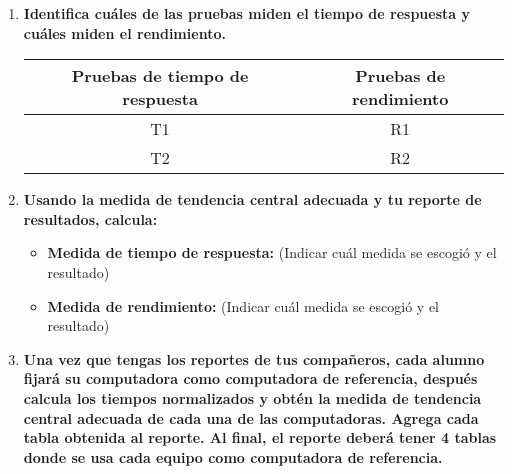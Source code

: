 \documentclass[12pt]{article}
\newcommand{\pl}[1]{\item \textbf{ #1 }}
\begin{document}
\begin{enumerate}[label=(\arabic{section}.\arabic{subsection}.\arabic{enumi})]
    \pl{Identifica cuáles de las pruebas miden el tiempo de respuesta y cuáles miden el rendimiento.}
    \begin{table}[htb]
        \centering
        \begin{tabular}{|c|c|}
        \hline
        Pruebas de tiempo de respuesta & Pruebas de rendimiento \\
        \hline
        T1 & R1 \\
        \hline
        T2 & R2 \\
        \hline
        \end{tabular}
    \end{table}\par

    \pl{Usando la medida de tendencia central adecuada y tu reporte de resultados, calcula:}
    \begin{itemize}
        \pl{Medida de tiempo de respuesta:}(Indicar cuál medida se escogió y el resultado)\par
    
        \pl{Medida de rendimiento:} (Indicar cuál medida se escogió y el resultado)\par
    \end{itemize}

    \pl{Una vez que tengas los reportes de tus compañeros, cada alumno fijará su computadora como computadora de referencia, después calcula los tiempos normalizados y obtén la medida de tendencia central adecuada de cada una de las computadoras. Agrega cada tabla obtenida al reporte. Al final, el reporte deberá tener 4 tablas donde se usa cada equipo como computadora de referencia.}


\end{enumerate}
\end{document}
